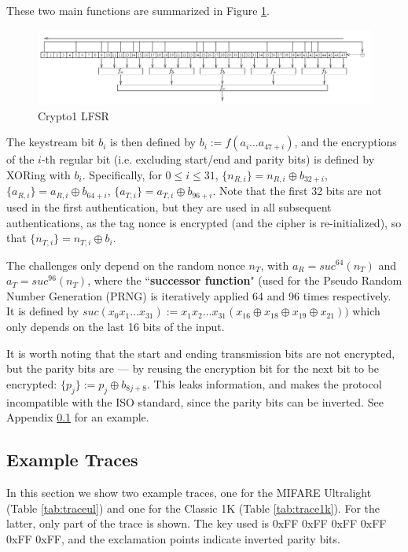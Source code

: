 \documentclass[fleqn,10pt]{SelfArx} %
\begin{document}
These two main functions are summarized in Figure \ref{fig:lfsr}.

\begin{figure}[h]
  \hfill\includegraphics[width=\linewidth]{img/lfsr.png} \hspace*{\fill}
  \caption{Crypto1 LFSR \cite{classicvulnerabilities}}
  \label{fig:lfsr}
\end{figure}

The keystream bit $b_i$ is then defined by $b_i := f(a_i\ldots a_{47+i})$, and the encryptions of the $i$-th regular bit (i.e. excluding start/end and parity bits) is defined by XORing with $b_i$. Specifically, for $0\le i \le 31$, $\{n_{R,i}\}=n_{R,i} \oplus b_{32+i}$, $\{a_{R,i}\}=a_{R,i} \oplus b_{64+i}$, $\{a_{T,i}\}=a_{T,i} \oplus b_{96+i}$. Note that the first 32 bits are not used in the first authentication, but they are used in all subsequent authentications, as the tag nonce is encrypted (and the cipher is re-initialized), so that $\{n_{T,i}\}=n_{T,i} \oplus b_i$. 

The challenges only depend on the random nonce $n_T$, with $a_R=suc^{64}(n_T)$ and $a_T=suc^{96}(n_T)$, where the ``{\bf successor function}" (used for the Pseudo Random Number Generation (PRNG) is iteratively applied 64 and 96 times respectively. It is defined by $suc(x_0x_1\ldots x_{31}):=x_1x_2\ldots x_{31}(x_{16}\oplus x_{18}\oplus x_{19}\oplus x_{21}))$ which only depends on the last 16 bits of the input.


It is worth noting that the start and ending transmission bits are not encrypted, but the parity bits are --- by reusing the encryption bit for the next bit to be encrypted: $\{p_j\} :=p_j \oplus b_{8j +8}$. This leaks information, and makes the protocol incompatible with the ISO standard, since the parity bits can be inverted. See Appendix \ref{app:traces} for an example.


\subsection{Example Traces}
\label{app:traces}

In this section we show two example traces, one for the MIFARE Ultralight (Table \ref{tab:traceul}) and one for the Classic 1K (Table \ref{tab:trace1k}). For the latter, only part of the trace is shown. The key used is 0xFF 0xFF 0xFF 0xFF 0xFF 0xFF, and the exclamation points indicate inverted parity bits.
\end{document}
